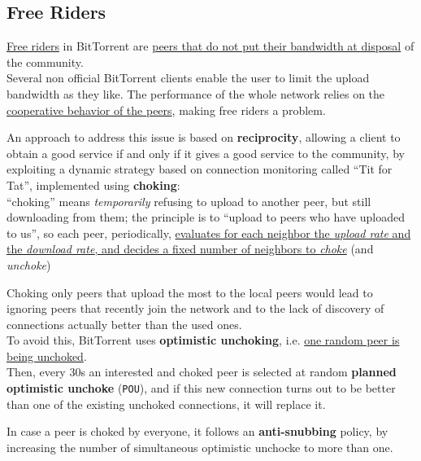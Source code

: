 \subsection{Free Riders}
\ul{Free riders} in BitTorrent are \ul{peers that do not put their bandwidth at disposal} of the community.\\
Several non official BitTorrent clients enable the user to limit the upload bandwidth as they like.
The performance of the whole network relies on the \ul{cooperative behavior of the peers}, making free riders a problem.

An approach to address this issue is based on \textbf{reciprocity}, allowing a client to obtain a good service if and only if it gives a good service to the community, by exploiting a dynamic strategy based on connection monitoring called ``Tit for Tat'', implemented using \textbf{choking}:\\
``choking'' means \textit{temporarily} refusing to upload to another peer, but still downloading from them;  
the principle is to ``upload to peers who have uploaded to us'', so each peer, periodically, \ul{evaluates for each neighbor  the \textit{upload rate} and the \textit{download rate}, and decides a fixed number of neighbors to \textit{choke}} (and \textit{unchoke})


Choking only peers that upload the most to the local peers would lead to ignoring peers that recently join the network
and to the lack of discovery of connections actually better than the used ones.\\
To avoid this, BitTorrent uses \textbf{optimistic unchoking}, i.e. \ul{one random peer is being unchoked}.\\
Then, every 30s an interested and choked peer is selected at random \textbf{planned optimistic unchoke} (\texttt{POU}), and if this new connection turns out to be better than one of the existing
unchoked connections, it will replace it.

In case a peer is choked by everyone, it follows an \textbf{anti-snubbing} policy, by increasing the number of simultaneous optimistic unchocke to more than one.


